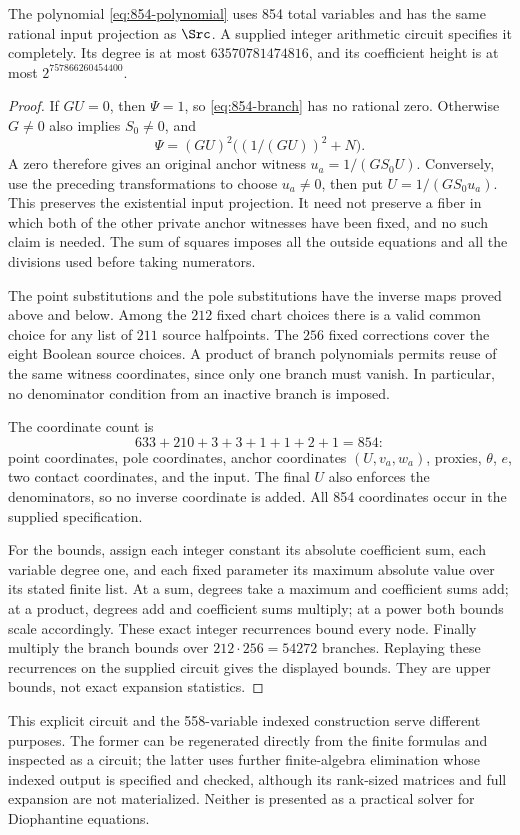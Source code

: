 \begin{proposition}\label{prop:854-explicit}
The polynomial \eqref{eq:854-polynomial} uses 854 total variables
and has the same rational input projection as $\Src$. A supplied
integer arithmetic circuit specifies it completely. Its degree is
at most $63570781474816$, and its coefficient height is at most
$2^{757866260454400}$.
\end{proposition}
\begin{proof}
If $GU=0$, then $\Psi=1$, so \eqref{eq:854-branch} has no rational
zero. Otherwise $G\ne0$ also implies $S_0\ne0$, and
\[
 \Psi=(GU)^2\bigl((1/(GU))^2+N\bigr).
\]
A zero therefore gives an original anchor witness
$u_a=1/(GS_0U)$. Conversely, use the preceding transformations to
choose $u_a\ne0$, then put $U=1/(GS_0u_a)$. This preserves the
existential input projection. It need not preserve a fiber in which
both of the other private anchor witnesses have been fixed, and no
such claim is needed. The sum of squares imposes all the outside
equations and all the divisions used before taking numerators.

The point substitutions and the pole substitutions have the inverse
maps proved above and below. Among the $212$ fixed chart choices
there is a valid common choice for any list of $211$ source halfpoints.
The $256$ fixed corrections cover the eight Boolean source choices.
A product of branch polynomials permits reuse of the same witness
coordinates, since only one branch must vanish. In particular, no
denominator condition from an inactive branch is imposed.

The coordinate count is
\[
 633+210+3+3+1+1+2+1=854:
\]
point coordinates, pole coordinates, anchor coordinates $(U,v_a,w_a)$,
proxies, $\theta$, $e$, two contact coordinates, and the input.
The final $U$ also enforces the denominators, so no inverse coordinate
is added. All 854 coordinates occur in the supplied specification.

For the bounds, assign each integer constant its absolute coefficient
sum, each variable degree one, and each fixed parameter its maximum
absolute value over its stated finite list. At a sum, degrees take a
maximum and coefficient sums add; at a product, degrees add and
coefficient sums multiply; at a power both bounds scale accordingly.
These exact integer recurrences bound every node. Finally multiply the
branch bounds over $212\cdot256=54272$ branches. Replaying these
recurrences on the supplied circuit gives the displayed bounds.
They are upper bounds, not exact expansion statistics.
\end{proof}

This explicit circuit and the 558-variable indexed construction
serve different purposes. The former can be regenerated directly from
the finite formulas and inspected as a circuit; the latter uses further
finite-algebra elimination whose indexed output is specified and checked,
although its rank-sized matrices and full expansion are not materialized.
Neither is presented as a practical solver for Diophantine equations.
